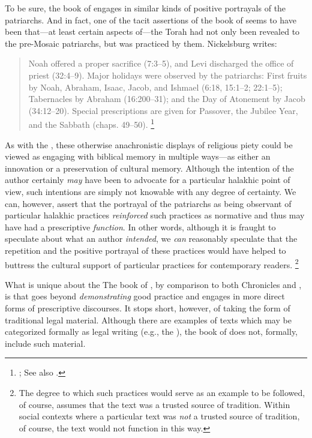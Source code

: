 To be sure, the book of \jub engages in similar kinds of positive portrayals of the patriarchs. And in fact, one of the tacit assertions of the book of \jub seems to have been that---at least certain aspects of---the Torah had not only been revealed to the pre-Mosaic patriarchs, but was practiced by them. Nickelsburg writes:
    \begin{quote}
        Noah offered a proper sacrifice (7:3--5), and Levi discharged the office of priest (32:4--9). Major holidays were observed by the patriarchs: First fruits by Noah, Abraham, Isaac, Jacob, and Ishmael (6:18, 15:1--2; 22:1--5); Tabernacles by Abraham (16:200--31); and the Day of Atonement by Jacob (34:12--20). Special prescriptions are given for Passover, the Jubilee Year, and the Sabbath (chaps. 49--50).%
        \footnote{\cite[69]{nickelsburg2005};
            See also \cite[70]{crawford2008}.}
    \end{quote}
\noindent
As with the \ga, these otherwise anachronistic displays of religious piety could be viewed as engaging with biblical memory in multiple ways---as either an innovation or a preservation of cultural memory. Although the intention of the author certainly \emph{may} have been to advocate for a particular halakhic point of view, such intentions are simply not knowable with any degree of certainty. We can, however, assert that the portrayal of the patriarchs as being observant of particular halakhic practices \emph{reinforced} such practices as normative and thus may have had a prescriptive \emph{function}. In other words, although it is fraught to speculate about what an author \emph{intended}, we \emph{can} reasonably speculate that the repetition and the positive portrayal of these practices would have helped to buttress the cultural support of particular practices for contemporary readers.
    \footnote{The degree to which such practices would serve as an example to be followed, of course, assumes that the text was a trusted source of tradition. Within social contexts where a particular text was \emph{not} a trusted source of tradition, of course, the text would not function in this way.}

What is unique about the The book of \jub, by comparison to both Chronicles and \ga, is that \jub goes beyond \emph{demonstrating} good practice and engages in more direct forms of prescriptive discourses. It stops short, however, of taking the form of traditional legal material. Although there are examples of \rwb texts which may be categorized formally as legal writing (e.g., the \templescroll\autocite{fraade_goldstein-etal2017}), the book of \jub does not, formally, include such material. 

